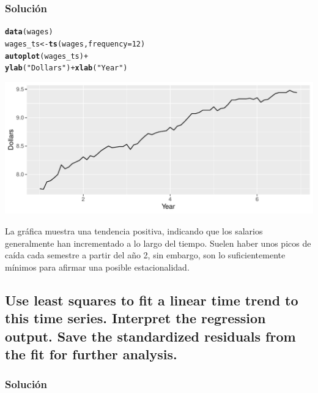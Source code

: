 \documentclass[12pt]{article}\usepackage[]{graphicx}\usepackage[]{xcolor}
\makeatletter
\def\maxwidth{ %
  \ifdim\Gin@nat@width>\linewidth
    \linewidth
  \else
    \Gin@nat@width
  \fi
}
\newcommand{\hlnum}[1]{\textcolor[rgb]{0.686,0.059,0.569}{#1}}%
\newcommand{\hlsng}[1]{\textcolor[rgb]{0.192,0.494,0.8}{#1}}%
\newcommand{\hlopt}[1]{\textcolor[rgb]{0,0,0}{#1}}%
\newcommand{\hldef}[1]{\textcolor[rgb]{0.345,0.345,0.345}{#1}}%
\newcommand{\hlkwb}[1]{\textcolor[rgb]{0.69,0.353,0.396}{#1}}%
\newcommand{\hlkwc}[1]{\textcolor[rgb]{0.333,0.667,0.333}{#1}}%
\newcommand{\hlkwd}[1]{\textcolor[rgb]{0.737,0.353,0.396}{\textbf{#1}}}%
\newenvironment{kframe}{%
 \def\at@end@of@kframe{}%
 \ifinner\ifhmode%
  \def\at@end@of@kframe{\end{minipage}}%
  \begin{minipage}{\columnwidth}%
 \fi\fi%
 \def\FrameCommand##1{\hskip\@totalleftmargin \hskip-\fboxsep
 \colorbox{shadecolor}{##1}\hskip-\fboxsep
     \hskip-\linewidth \hskip-\@totalleftmargin \hskip\columnwidth}%
 \MakeFramed {\advance\hsize-\width
   \@totalleftmargin\z@ \linewidth\hsize
   \@setminipage}}%
 {\par\unskip\endMakeFramed%
 \at@end@of@kframe}
\newenvironment{knitrout}{}{} %
\makeatother
\begin{document}
\subsubsection{Solución}


\begin{knitrout}
\color{fgcolor}\begin{kframe}
\begin{alltt}
\hlkwd{data}\hldef{(wages)}
\hldef{wages_ts} \hlkwb{<-} \hlkwd{ts}\hldef{(wages,} \hlkwc{frequency} \hldef{=} \hlnum{12}\hldef{)}
\hlkwd{autoplot}\hldef{(wages_ts)} \hlopt{+}
  \hlkwd{ylab}\hldef{(}\hlsng{"Dollars"}\hldef{)} \hlopt{+} \hlkwd{xlab}\hldef{(}\hlsng{"Year"}\hldef{)}
\end{alltt}
\end{kframe}
\includegraphics[width=\maxwidth]{figure/unnamed-chunk-11-1} 
\end{knitrout}

La gráfica muestra una tendencia positiva, indicando que los salarios generalmente han incrementado a lo largo del tiempo. Suelen haber unos picos de caída cada semestre a partir del año 2, sin embargo, son lo suficientemente mínimos para afirmar una posible estacionalidad.

\subsection{Use least squares to fit a linear time trend to this time series. Interpret the
regression output. Save the standardized residuals from the fit for further analysis.}

\subsubsection{Solución}
\end{document}
